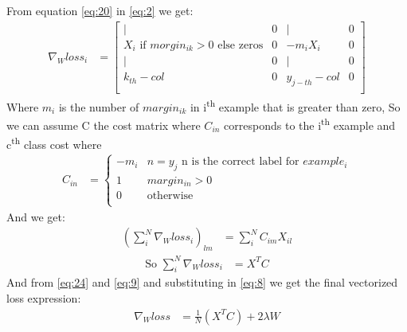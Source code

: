\documentclass[]{article}
\begin{document}
From equation \eqref{eq:20} in \eqref{eq:2} we get:
\begin{align}
	\nabla_W loss_{i} &= \left[\begin{array}{cccc}
	| & 0 & | & 0 \\
	\text{$X_i$ if $morgin_{ik} > 0$  else zeros} & 0 & -m_i X_i & 0 \\
	| & 0 & | & 0 \\
	k_{th}-col & 0 & y_{j-th}-col & 0 \\
	\end{array}\right]
\end{align}
Where $m_i$ is the number of $margin_{ik}$ in i\textsuperscript{th} example that is greater than zero, \newline So we can assume C the cost matrix where $C_{in}$ corresponds to the i\textsuperscript{th} example and c\textsuperscript{th} class cost where
\begin{align}
	C_{in} &= \begin{cases}
	-m_i & n=y_j \text{ n is the correct label for $example_i$}\\
	1 & margin_{in} > 0 \\
	0 & \text{otherwise} \\
	\end{cases}
\end{align}
And we get:
\begin{align}
	\left(\sum_{i}^{N} \nabla_W loss_i\right)_{lm} &= \sum_{i}^{N} C_{im} X_{il} 
\end{align}
\begin{align}
	\text{So } \sum_{i}^{N} \nabla_W loss_i &= X^T C \label{eq:24}
\end{align}
And from \eqref{eq:24} and \eqref{eq:9} and substituting in \eqref{eq:8} we get the final vectorized loss expression:
\begin{align}
	 \nabla_W loss &= \frac{1}{N} \left( X^T C \right) +  2 \lambda W
\end{align} 
\end{document}
